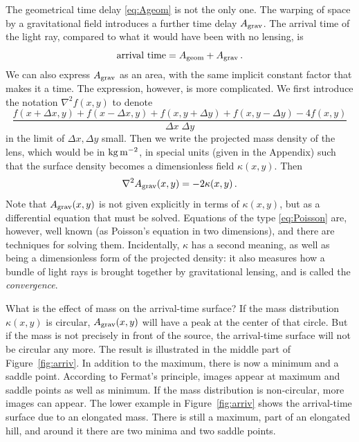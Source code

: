 \documentclass[12pt,preprint]{aastex}
\newcommand{\figref}[1]{Figure~\ref{fig:#1}}
\begin{document}
The geometrical time delay \eqref{eq:Ageom} is not the only one.  The
warping of space by a gravitational field introduces a further time
delay $A_{\rm grav}$.  The arrival time of the light ray, compared to
what it would have been with no lensing, is
\begin{equation} \label{eq:Aarriv}
\hbox{arrival time} = A_{\rm geom} + A_{\rm grav} \,.
\end{equation}
We can also express $A_{\rm grav}$ as an area, with the same implicit
constant factor that makes it a time.  The expression, however, is
more complicated.  We first introduce the notation $\nabla^2 f(x,y)$
to denote
\begin{equation}
 \frac{ f(x+\Delta x, y) + f(x-\Delta x, y) +
        f(x, y+\Delta y) + f(x, y-\Delta y) - 4 f(x,y) }
      {\Delta x \; \Delta y}
\end{equation}
in the limit of $\Delta x,\Delta y$ small.  Then we write the
projected mass density of the lens, which would be in $\rm
kg\,m^{-2}$, in special units (given in the Appendix) such that the
surface density becomes a dimensionless field $\kappa(x,y)$.  Then
\begin{equation} \label{eq:Poisson}
\nabla^2 A_{\rm grav}(x,y) = -2\kappa(x,y) \,.
\end{equation}
Note that $A_{\rm grav}(x,y)$ is not given explicitly in terms of
$\kappa(x,y)$, but as a differential equation that must be solved.
Equations of the type \eqref{eq:Poisson} are, however, well known (as
Poisson's equation in two dimensions), and there are techniques for
solving them.  Incidentally, $\kappa$ has a second meaning, as well as
being a dimensionless form of the projected density: it also
measures how a bundle of light rays is brought together by
gravitational lensing, and is called the {\em convergence}.

What is the effect of mass on the arrival-time surface?  If the mass
distribution $\kappa(x,y)$ is circular, $A_{\rm grav}(x,y)$ will have
a peak at the center of that circle.  But if the mass is not precisely
in front of the source, the arrival-time surface will not be circular
any more.  The result is illustrated in the middle part of
\figref{arriv}.  In addition to the maximum, there is now a
minimum and a saddle point.  According to Fermat's principle, images
appear at maximum and saddle points as well as minimum.  If the mass
distribution is non-circular, more images can appear.  The lower
example in \figref{arriv} shows the arrival-time surface due
to an elongated mass.  There is still a maximum, part of an elongated
hill, and around it there are two minima and two saddle points.
\end{document}

